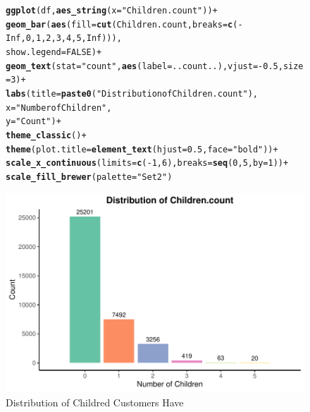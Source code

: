 \documentclass{article}\usepackage[]{graphicx}\usepackage[]{xcolor}
\makeatletter
\def\maxwidth{ %
  \ifdim\Gin@nat@width>\linewidth
    \linewidth
  \else
    \Gin@nat@width
  \fi
}
\newcommand{\hlnum}[1]{\textcolor[rgb]{0.686,0.059,0.569}{#1}}%
\newcommand{\hlsng}[1]{\textcolor[rgb]{0.192,0.494,0.8}{#1}}%
\newcommand{\hlopt}[1]{\textcolor[rgb]{0,0,0}{#1}}%
\newcommand{\hldef}[1]{\textcolor[rgb]{0.345,0.345,0.345}{#1}}%
\newcommand{\hlkwc}[1]{\textcolor[rgb]{0.333,0.667,0.333}{#1}}%
\newcommand{\hlkwd}[1]{\textcolor[rgb]{0.737,0.353,0.396}{\textbf{#1}}}%
\newenvironment{kframe}{%
 \def\at@end@of@kframe{}%
 \ifinner\ifhmode%
  \def\at@end@of@kframe{\end{minipage}}%
  \begin{minipage}{\columnwidth}%
 \fi\fi%
 \def\FrameCommand##1{\hskip\@totalleftmargin \hskip-\fboxsep
 \colorbox{shadecolor}{##1}\hskip-\fboxsep
     \hskip-\linewidth \hskip-\@totalleftmargin \hskip\columnwidth}%
 \MakeFramed {\advance\hsize-\width
   \@totalleftmargin\z@ \linewidth\hsize
   \@setminipage}}%
 {\par\unskip\endMakeFramed%
 \at@end@of@kframe}
\newenvironment{knitrout}{}{} %
\makeatother
\begin{document}
\begin{figure}[H] %
\centering
\begin{knitrout}
\color{fgcolor}\begin{kframe}
\begin{alltt}
\hlkwd{ggplot}\hldef{(df,} \hlkwd{aes_string}\hldef{(}\hlkwc{x} \hldef{=} \hlsng{"Children.count"}\hldef{))} \hlopt{+}
  \hlkwd{geom_bar}\hldef{(}\hlkwd{aes}\hldef{(}\hlkwc{fill} \hldef{=} \hlkwd{cut}\hldef{(Children.count,} \hlkwc{breaks} \hldef{=} \hlkwd{c}\hldef{(}\hlopt{-}\hlnum{Inf}\hldef{,} \hlnum{0}\hldef{,} \hlnum{1}\hldef{,} \hlnum{2}\hldef{,} \hlnum{3}\hldef{,} \hlnum{4}\hldef{,} \hlnum{5}\hldef{,} \hlnum{Inf}\hldef{))),}
           \hlkwc{show.legend} \hldef{=} \hlnum{FALSE}\hldef{)} \hlopt{+}
  \hlkwd{geom_text}\hldef{(}\hlkwc{stat} \hldef{=} \hlsng{"count"}\hldef{,} \hlkwd{aes}\hldef{(}\hlkwc{label} \hldef{= ..count..),} \hlkwc{vjust} \hldef{=} \hlopt{-}\hlnum{0.5}\hldef{,} \hlkwc{size}\hldef{=}\hlnum{3}\hldef{)} \hlopt{+}
  \hlkwd{labs}\hldef{(}\hlkwc{title} \hldef{=} \hlkwd{paste0}\hldef{(}\hlsng{"Distribution of Children.count"}\hldef{),}
       \hlkwc{x} \hldef{=} \hlsng{"Number of Children"}\hldef{,}
       \hlkwc{y} \hldef{=} \hlsng{"Count"}\hldef{)} \hlopt{+}
  \hlkwd{theme_classic}\hldef{()}\hlopt{+}
  \hlkwd{theme}\hldef{(}\hlkwc{plot.title} \hldef{=} \hlkwd{element_text}\hldef{(}\hlkwc{hjust} \hldef{=} \hlnum{0.5}\hldef{,} \hlkwc{face} \hldef{=} \hlsng{"bold"}\hldef{))} \hlopt{+}
  \hlkwd{scale_x_continuous}\hldef{(}\hlkwc{limits} \hldef{=} \hlkwd{c}\hldef{(}\hlopt{-}\hlnum{1}\hldef{,} \hlnum{6}\hldef{),} \hlkwc{breaks} \hldef{=} \hlkwd{seq}\hldef{(}\hlnum{0}\hldef{,} \hlnum{5}\hldef{,} \hlkwc{by} \hldef{=} \hlnum{1}\hldef{))} \hlopt{+}
  \hlkwd{scale_fill_brewer}\hldef{(}\hlkwc{palette} \hldef{=} \hlsng{"Set2"}\hldef{)}
\end{alltt}
\end{kframe}
\includegraphics[width=\maxwidth]{figure/unnamed-chunk-31-1} 
\end{knitrout}
\vspace{0pt} %
\caption{Distribution of Childred Customers Have}
\end{figure}
\end{document}
